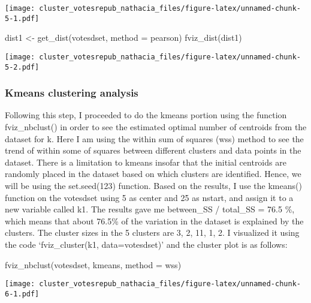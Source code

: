\documentclass[
]{article}
\newenvironment{Shaded}{\begin{snugshade}}{\end{snugshade}}
\newcommand{\AttributeTok}[1]{\textcolor[rgb]{0.77,0.63,0.00}{#1}}
\newcommand{\FunctionTok}[1]{\textcolor[rgb]{0.00,0.00,0.00}{#1}}
\newcommand{\NormalTok}[1]{#1}
\newcommand{\OtherTok}[1]{\textcolor[rgb]{0.56,0.35,0.01}{#1}}
\newcommand{\StringTok}[1]{\textcolor[rgb]{0.31,0.60,0.02}{#1}}
\begin{document}
\texttt{[image: cluster\_votesrepub\_nathacia\_files/figure-latex/unnamed-chunk-5-1.pdf]}

\begin{Shaded}
\begin{Highlighting}[]
\NormalTok{dist1 }\OtherTok{\textless{}{-}} \FunctionTok{get\_dist}\NormalTok{(votesdset, }\AttributeTok{method =} \StringTok{\textquotesingle{}pearson\textquotesingle{}}\NormalTok{)}
\FunctionTok{fviz\_dist}\NormalTok{(dist1)}
\end{Highlighting}
\end{Shaded}

\texttt{[image: cluster\_votesrepub\_nathacia\_files/figure-latex/unnamed-chunk-5-2.pdf]}

\hypertarget{kmeans-clustering-analysis}{%
\subsubsection{Kmeans clustering
analysis}\label{kmeans-clustering-analysis}}

Following this step, I proceeded to do the kmeans portion using the
function fviz\_nbclust() in order to see the estimated optimal number of
centroids from the dataset for k. Here I am using the within sum of
squares (wss) method to see the trend of within some of squares between
different clusters and data points in the dataset. There is a limitation
to kmeans insofar that the initial centroids are randomly placed in the
dataset based on which clusters are identified. Hence, we will be using
the set.seed(123) function. Based on the results, I use the kmeans()
function on the votesdset using 5 as center and 25 as nstart, and assign
it to a new variable called k1. The results gave me between\_SS /
total\_SS = 76.5 \%, which means that about 76.5\% of the variation in
the dataset is explained by the clusters. The cluster sizes in the 5
clusters are 3, 2, 11, 1, 2. I visualized it using the code
`fviz\_cluster(k1, data=votesdset)' and the cluster plot is as follows:

\begin{Shaded}
\begin{Highlighting}[]
\FunctionTok{fviz\_nbclust}\NormalTok{(votesdset, kmeans, }\AttributeTok{method =} \StringTok{\textquotesingle{}wss\textquotesingle{}}\NormalTok{)}
\end{Highlighting}
\end{Shaded}

\texttt{[image: cluster\_votesrepub\_nathacia\_files/figure-latex/unnamed-chunk-6-1.pdf]}
\end{document}
